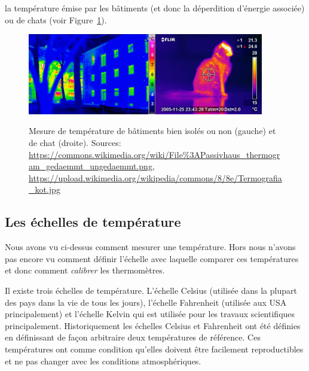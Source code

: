 \documentclass[a4paper,12pt]{book}
\begin{document}
la température émise par les bâtiments (et donc la déperdition d'énergie associée) ou de chats (voir Figure~\ref{fig_thermographie}).
\begin{figure}
\begin{center}
\includegraphics[width=0.5\textwidth]{figs/mais_infra.png}\quad \includegraphics[width=0.42\textwidth]{figs/Termografia_cat.jpg}
\caption{Mesure de température de bâtiments bien isolés ou non (gauche) et de chat (droite). Sources: \url{https://commons.wikimedia.org/wiki/File\%3APassivhaus_thermogram_gedaemmt_ungedaemmt.png}, \url{https://upload.wikimedia.org/wikipedia/commons/8/8e/Termografia_kot.jpg}}
\label{fig_thermographie}
\end{center}
\end{figure}  

\subsection{Les échelles de température}

Nous avons vu ci-dessus comment mesurer une température. Hors nous n'avons pas encore vu comment définir l'échelle 
avec laquelle comparer ces températures et donc comment \textit{calibrer} les thermomètres. 

Il existe trois échelles de température. L'échelle Celsius (utilisée dans la plupart des pays dans la vie de tous les jours), 
l'échelle Fahrenheit (utilisée aux USA principalement) et l'échelle Kelvin qui est utilisée pour les travaux scientifiques
principalement. Historiquement les échelles Celsius et Fahrenheit ont été définies en définissant
de façon arbitraire deux températures de référence. Ces températures ont comme condition qu'elles doivent être facilement reproductibles
et ne pas changer avec les conditions atmosphériques. 
\end{document}
